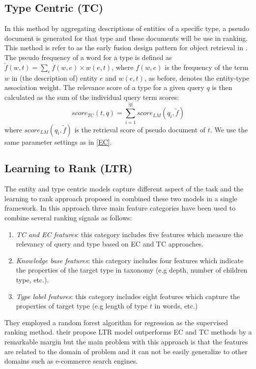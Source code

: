 \subsection{Type Centric (TC)}
In this method by aggregating descriptions of entities of a specific type, a pseudo document is generated for that type and these documents will be use in ranking. This method is refer to as the early fusion design pattern for object retrieval in \cite{zhang2017design}. The pseudo frequency of a word for a type is defined as 
$\tilde{f}(w,t) = \sum_{e}{f(w,e)\times w(e,t)}$, where $f(w,e)$ is the frequency of the term $w$ in (the description of) entity $e$ and $w(e,t)$, as before, denotes the entity-type association weight. The relevance score of a type for a given query $q$ is then calculated as the sum of the individual query term scores:
\begin{equation}
score_{TC}(t,q) = \sum_{i=1}^{|q|}{score_{LM}(q_i,\tilde{f})}
\end{equation}
where $score_{LM}(q_i,\tilde{f})$ is the retrieval score of pseudo document of $t$. We use the same parameter settings as in \ref{EC}.

\subsection{Learning to Rank (LTR)}
The entity and type centric models capture different aspect of the task and the learning to rank approach proposed in \cite{Garigliotti:2017:TTI:3077136.3080659} combined these two models in a single framework. In this approach three main feature categories have been used to combine several ranking signals as follows:
\begin{enumerate}
	\item \textit{TC and EC features}: this category includes five features which measure the relevancy of query and type based on EC and TC approaches.
	\item \textit{Knowledge base features}: this category includes four features which indicate the properties of the target type in taxonomy (e.g depth, number of children type, etc.).
	\item \textit{Type label features}: this category includes eight features which capture the properties of target type (e.g length of type $t$ in words, etc.)
\end{enumerate}
They employed a random forest algorithm for regression as the supervised ranking method. their propose LTR model outperforms EC and TC methods by a remarkable margin but the main problem with this approach is that the features are related to the domain of problem and it can not be easily generalize to other domains such as e-commerce search engines.
